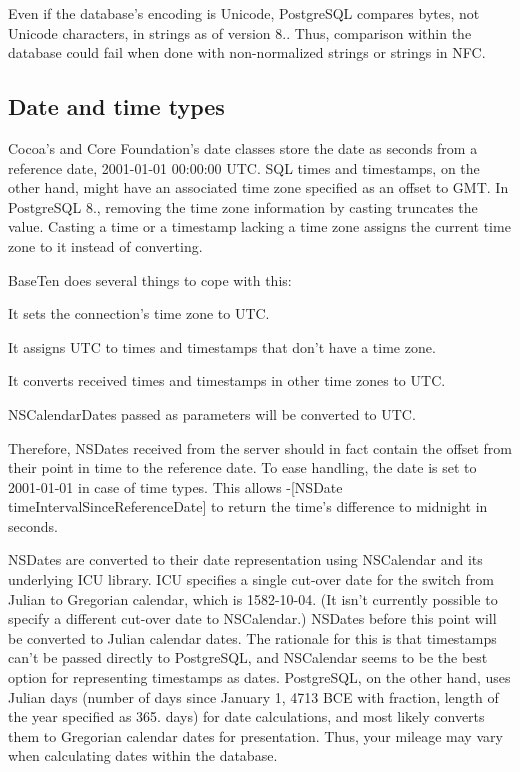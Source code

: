 Even if the database's encoding is Unicode, Postgre\+S\+Q\+L compares bytes, not Unicode characters, in strings as of version 8.. Thus, comparison within the database could fail when done with non-\/normalized strings or strings in N\+F\+C.\hypertarget{database_types_date_handling}{}\subsection{Date and time types}\label{database_types_date_handling}
Cocoa's and Core Foundation's date classes store the date as seconds from a reference date, 2001-\/01-\/01 00\+:00\+:00 U\+T\+C. S\+Q\+L times and timestamps, on the other hand, might have an associated time zone specified as an offset to G\+M\+T. In Postgre\+S\+Q\+L 8., removing the time zone information by casting truncates the value. Casting a time or a timestamp lacking a time zone assigns the current time zone to it instead of converting.

Base\+Ten does several things to cope with this\+: \begin{DoxyItemize}
\item It sets the connection's time zone to U\+T\+C. \item It assigns U\+T\+C to times and timestamps that don't have a time zone. \item It converts received times and timestamps in other time zones to U\+T\+C. \item N\+S\+Calendar\+Dates passed as parameters will be converted to U\+T\+C.\end{DoxyItemize}
Therefore, N\+S\+Dates received from the server should in fact contain the offset from their point in time to the reference date. To ease handling, the date is set to 2001-\/01-\/01 in case of time types. This allows -\/\mbox{[}N\+S\+Date time\+Interval\+Since\+Reference\+Date\mbox{]} to return the time's difference to midnight in seconds.

N\+S\+Dates are converted to their date representation using N\+S\+Calendar and its underlying I\+C\+U library. I\+C\+U specifies a single cut-\/over date for the switch from Julian to Gregorian calendar, which is 1582-\/10-\/04. (It isn't currently possible to specify a different cut-\/over date to N\+S\+Calendar.) N\+S\+Dates before this point will be converted to Julian calendar dates. The rationale for this is that timestamps can't be passed directly to Postgre\+S\+Q\+L, and N\+S\+Calendar seems to be the best option for representing timestamps as dates. Postgre\+S\+Q\+L, on the other hand, uses Julian days (number of days since January 1, 4713 B\+C\+E with fraction, length of the year specified as 365. days) for date calculations, and most likely converts them to Gregorian calendar dates for presentation. Thus, your mileage may vary when calculating dates within the database.

